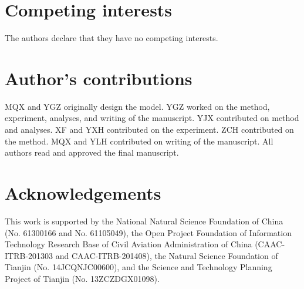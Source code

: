 \documentclass{bmcart}
\begin{document}
\begin{backmatter}

\section*{Competing interests}
The authors declare that they have no competing interests.

\section*{Author's contributions}
MQX and YGZ originally design the model. YGZ worked on the method, experiment, analyses, and writing of the manuscript. YJX  contributed on method and analyses.  XF and YXH contributed on the experiment. ZCH contributed on the method. MQX and YLH contributed on writing of the manuscript. All authors read and approved the final manuscript.

\section*{Acknowledgements}
This work is supported by the National Natural Science Foundation of China (No. 61300166 and No. 61105049), the Open Project Foundation of Information Technology Research Base of Civil Aviation Administration of China (CAAC-ITRB-201303 and CAAC-ITRB-201408), the Natural Science Foundation of Tianjin (No. 14JCQNJC00600), and the Science and Technology Planning Project of Tianjin (No. 13ZCZDGX01098).




\end{backmatter}
\end{document}
